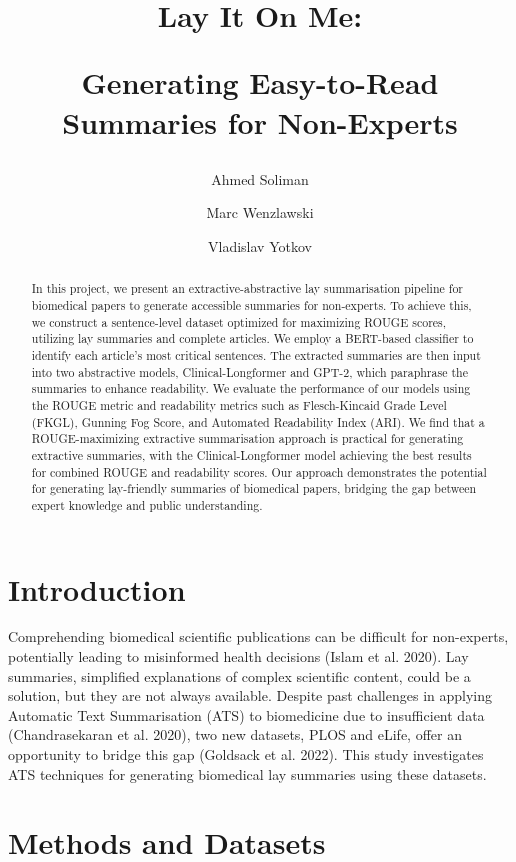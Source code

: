 \documentclass[
]{article}
\title{Lay It On Me:

Generating Easy-to-Read Summaries for Non-Experts}
\author{Ahmed Soliman \and Marc Wenzlawski \and Vladislav Yotkov}
\date{}
\begin{document}
\maketitle
\begin{abstract}
In this project, we present an extractive-abstractive lay summarisation
pipeline for biomedical papers to generate accessible summaries for
non-experts. To achieve this, we construct a sentence-level dataset
optimized for maximizing ROUGE scores, utilizing lay summaries and
complete articles. We employ a BERT-based classifier to identify each
article's most critical sentences. The extracted summaries are then
input into two abstractive models, Clinical-Longformer and GPT-2, which
paraphrase the summaries to enhance readability. We evaluate the
performance of our models using the ROUGE metric and readability metrics
such as Flesch-Kincaid Grade Level (FKGL), Gunning Fog Score, and
Automated Readability Index (ARI). We find that a ROUGE-maximizing
extractive summarisation approach is practical for generating extractive
summaries, with the Clinical-Longformer model achieving the best results
for combined ROUGE and readability scores. Our approach demonstrates the
potential for generating lay-friendly summaries of biomedical papers,
bridging the gap between expert knowledge and public understanding.
\end{abstract}

\hypertarget{sec:introduction}{%
\section{Introduction}\label{sec:introduction}}

Comprehending biomedical scientific publications can be difficult for
non-experts, potentially leading to misinformed health decisions (Islam
et al. 2020). Lay summaries, simplified explanations of complex
scientific content, could be a solution, but they are not always
available. Despite past challenges in applying Automatic Text
Summarisation (ATS) to biomedicine due to insufficient data
(Chandrasekaran et al. 2020), two new datasets, PLOS and eLife, offer an
opportunity to bridge this gap (Goldsack et al. 2022). This study
investigates ATS techniques for generating biomedical lay summaries
using these datasets.

\hypertarget{sec:methods}{%
\section{Methods and Datasets}\label{sec:methods}}
\end{document}
